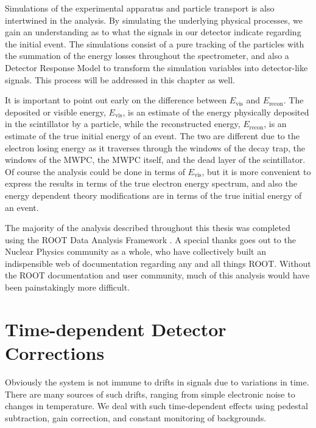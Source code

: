 Simulations of the experimental apparatus and particle transport is also intertwined
in the analysis. By simulating the underlying physical processes, we gain an understanding
as to what the signals in our detector indicate regarding the initial event. The simulations
consist of a pure tracking of the particles with the summation of the energy losses throughout
the spectrometer, and also a Detector Response Model to transform the simulation variables
into detector-like signals. This process will be addressed in this chapter as well.

It is important to point out early on the difference between $E_{\mathrm{vis}}$ and
$E_{\mathrm{recon}}$. The deposited or visible energy, $E_{\mathrm{vis}}$, is an estimate of the energy
physically deposited in the
scintillator by a particle, while the reconstructed energy, $E_{\mathrm{recon}}$, is an estimate of
the true initial energy of an event. The two are different due to the electron losing energy
as it traverses through the windows of the decay trap, the windows of the MWPC,
the MWPC itself, and the dead layer of the scintillator. Of course the analysis could be
done in terms of $E_{\mathrm{vis}}$, but it is more convenient to express the results
in terms of the true electron energy spectrum, and also the energy dependent theory modifications
are in terms of the true initial energy of an event.

The majority of the analysis described throughout this thesis was completed using
the ROOT Data Analysis Framework \cite{brun1997root}. A special thanks goes out to
the Nuclear Physics community as a whole, who have collectively built an indispensible
web of documentation regarding any and all things ROOT. Without the ROOT documentation
and user community, much of this analysis would have been painstakingly more difficult.




\section{Time-dependent Detector Corrections}

Obviously the system is not immune to drifts in signals due to variations
in time. There are many sources of such drifts, ranging from simple
electronic noise to changes in temperature. We deal with such time-dependent
effects using pedestal subtraction, gain correction, and constant monitoring
of backgrounds.


